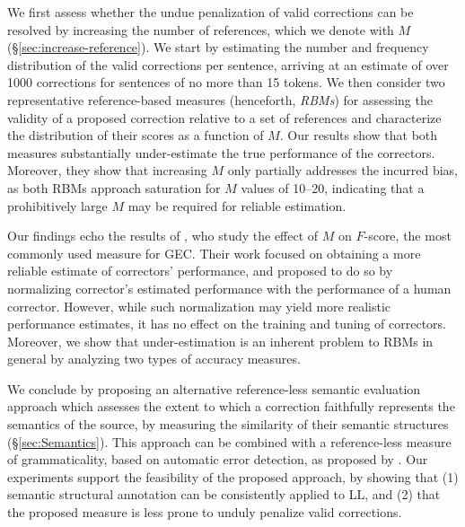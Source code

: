 \documentclass[letter,11pt]{article}
\begin{document}
We first assess whether the undue penalization of valid corrections can be resolved by increasing the number
of references, which we denote with $M$ (\S \ref{sec:increase-reference}).
We start by estimating the number and frequency distribution of the valid corrections per sentence,
arriving at an estimate of over 1000 corrections for sentences of no more than 15 tokens.
We then consider two representative reference-based measures (henceforth, {\it RBMs}) for
assessing the validity of a proposed correction relative to a set of references
and characterize the distribution of their scores as a function of $M$. 
Our results show that both measures substantially under-estimate the true performance of
the correctors. Moreover, they show that increasing $M$ only partially addresses
the incurred bias, as both RBMs approach saturation for $M$ values of 10--20,
indicating that a prohibitively large $M$ may be required for reliable estimation.

Our findings echo the results of , who study the effect of $M$
on $F$-score, the most commonly used measure for GEC. Their work focused on
obtaining a more reliable estimate of correctors' performance, and proposed to do so
by normalizing corrector's estimated performance with the performance of a human corrector. However, while such normalization may yield more realistic performance estimates,
it has no effect on the training and tuning of correctors. {\color{red}Moreover, we show that under-estimation is an inherent problem to RBMs in general by analyzing two types of accuracy measures.}

We conclude by proposing an alternative reference-less semantic evaluation approach which assesses the extent to which
a correction faithfully represents the semantics of the source, by measuring the similarity of their semantic structures (\S \ref{sec:Semantics}).
This approach can be combined with a reference-less measure of grammaticality, based on automatic error detection, as
proposed by .
Our experiments support the feasibility of the proposed approach,
by showing that (1) semantic structural annotation can be consistently applied to LL, and (2) that the proposed measure is less prone to unduly penalize valid corrections.
%
%
%
%
\end{document}
